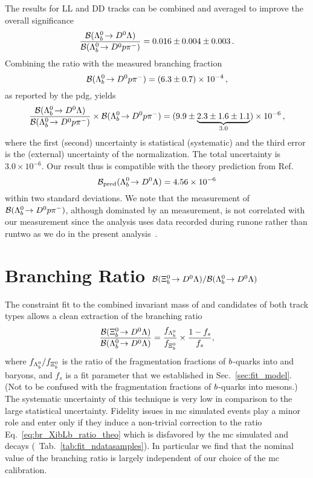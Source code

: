 The results for \gls{LL} and \gls{DD} tracks can be combined and averaged to improve the overall significance
\begin{equation*}
    \frac{{\mathcal{B}}({{\Lambda}^0_{b}}\!\rightarrow {\ensuremath{{D}^0}}{\ensuremath{\Lambda}})}{{\mathcal{B}}({{\Lambda}^0_{b}}\!\rightarrow {\ensuremath{{D}^0}}{\ensuremath{p}}{\ensuremath{{\pi}^-}})} = 0.016 \pm 0.004 \pm 0.003 \,.
\end{equation*}
Combining the ratio with the measured branching fraction
\begin{equation*}
    {\ensuremath{\mathcal{B}}}({{\Lambda}^0_{b}}\!\rightarrow {\ensuremath{{D}^0}}{\ensuremath{p}}{\ensuremath{{\pi}^-}}) = (6.3 \pm 0.7) \times 10^{-4} \,,
\end{equation*}
as reported by the \gls{pdg}, yields
\begin{equation}
    \label{eq:br_fracLb}
    \frac{{\mathcal{B}}({{\Lambda}^0_{b}}\!\rightarrow {\ensuremath{{D}^0}}{\ensuremath{\Lambda}})}{{\mathcal{B}}({{\Lambda}^0_{b}}\!\rightarrow {\ensuremath{{D}^0}}{\ensuremath{p}}{\ensuremath{{\pi}^-}})} \times {\ensuremath{\mathcal{B}}}({{\Lambda}^0_{b}}\!\rightarrow {\ensuremath{{D}^0}}{\ensuremath{p}}{\ensuremath{{\pi}^-}}) = (9.9 \pm \underbrace{2.3 \pm 1.6 \pm 1.1}_{3.0}) \times 10^{-6} \,,
\end{equation}
where the first (second) uncertainty is statistical (systematic) and the third error is the (external) uncertainty of the normalization.
The total uncertainty is $3.0 \times 10^{-6}$.
Our result thus is compatible with the theory prediction from Ref.~\cite{brLbToDzLz_pred}
\begin{equation*}
    {\ensuremath{\mathcal{B}}}_\mathrm{pred}({{\Lambda}^0_{b}}\!\rightarrow {\ensuremath{{D}^0}}{\ensuremath{\Lambda}}) = 4.56 \times 10^{-6}
\end{equation*}
within two standard deviations.
We note that the measurement of ${\mathcal{B}}({{\Lambda}^0_{b}}\!\rightarrow {\ensuremath{{D}^0}}{\ensuremath{p}}{\ensuremath{{\pi}^-}})$, although dominated by an \lhcb measurement, is not correlated with our measurement since the \lhcb analysis uses data recorded during \gls{runone} rather than \gls{runtwo} as we do in the present analysis~\cite{pdg,LbToDzphAndLch}.

\section{Branching Ratio \texorpdfstring{${\mathcal{B}}({{\Xi}^0_{b}}\!\rightarrow {\ensuremath{{D}^0}}{\ensuremath{\Lambda}}) / {\mathcal{B}}({{\Lambda}^0_{b}}\!\rightarrow {\ensuremath{{D}^0}}{\ensuremath{\Lambda}})$}{B(Ξb → DΛ) / B(Λb → DΛ)}}
\label{sec:br_Xib}
The constraint fit to the combined invariant mass of \Dz and \Lz candidates of both track types allows a clean extraction of the branching ratio 
\begin{equation}
    \label{eq:br_XibLb_ratio_theo}
    \frac{{\mathcal{B}}({{\Xi}^0_{b}}\!\rightarrow {\ensuremath{{D}^0}}{\ensuremath{\Lambda}})}{{\mathcal{B}}({{\Lambda}^0_{b}}\!\rightarrow {\ensuremath{{D}^0}}{\ensuremath{\Lambda}})} = \frac{f_{{{\Lambda}^0_{b}}}}{f_{{{\Xi}^0_{b}}}} \times \frac{1 - f_s}{f_s},
\end{equation}
where $f_{{{\Lambda}^0_{b}}} / f_{{{\Xi}^0_{b}}}$ is the ratio of the fragmentation fractions of ${b}$-quarks into \Lb and \Xibz baryons, and $f_s$ is a fit parameter that we established in Sec.~\ref{sec:fit_model}. (Not to be confused with the fragmentation fractions of ${b}$-quarks into \Bs mesons.)
The systematic uncertainty of this technique is very low in comparison to the large statistical uncertainty.
Fidelity issues in \gls{mc} simulated events play a minor role and enter only if they induce a non-trivial correction to the ratio Eq.~\eqref{eq:br_XibLb_ratio_theo} which is disfavored by the \gls{mc} simulated \decay{\Lb}{\Dz\Lz} and \decay{\Xibz}{\Dz\Lz} decays (\cf{}~Tab.~\ref{tab:fit_ndatasamples}).
In particular we find that the nominal value of the branching ratio is largely independent of our choice of the \gls{mc} calibration.

